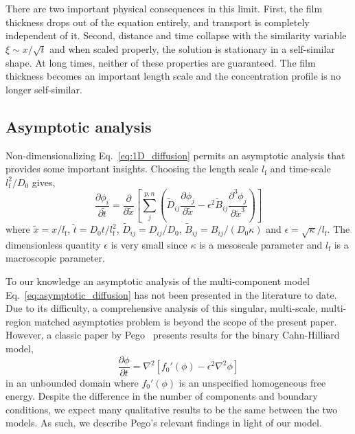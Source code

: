 \documentclass[journal=mamobx, layout=twocolumn]{achemso}
\newcommand{\txtf}{\mathrm{f}}
\begin{document}
There are two important physical consequences in this limit.
First, the film thickness drops out of the equation entirely, and transport is completely independent of it.
Second, distance and time collapse with the similarity variable $\xi \sim x/\sqrt{t}$ and when scaled properly, the solution is stationary in a self-similar shape.
At long times, neither of these properties are guaranteed.
The film thickness becomes an important length scale and the concentration profile is no longer self-similar.


\subsection{Asymptotic analysis}

Non-dimensionalizing Eq.~\ref{eq:1D_diffusion} permits an asymptotic analysis that provides some important insights.
Choosing the length scale $l_{\txtf}$ and time-scale $l_{\txtf}^{2}/D_{0}$ gives,
\begin{equation} \label{eq:asymptotic_diffusion}
\frac{\partial \phi_{i}}{\partial \tilde{t}} =  \frac{\partial}{\partial \tilde{x}} \left [ \sum_{j}^{p,n} \left ( \tilde{D}_{ij} \frac{\partial \phi_{j}}{\partial \tilde{x}} - \epsilon^{2} \tilde{B}_{ij} \frac{\partial^{3} \phi_{j}}{\partial \tilde{x}^{3}} \right ) \right ]
\end{equation}
where $\tilde{x} = x/l_{\txtf}$, $\tilde{t} = D_{0} t/l_{\txtf}^{2}$, $\tilde{D}_{ij} = D_{ij}/D_{0}$, $\tilde{B}_{ij} = B_{ij}/(D_{0} \kappa)$ and $\epsilon = \sqrt{\kappa}/l_{\txtf}$.
The dimensionless quantity $\epsilon$ is very small since $\kappa$ is a mesoscale parameter and $l_{\txtf}$ is a macroscopic parameter.

To our knowledge an asymptotic analysis of the multi-component model Eq.~\ref{eq:asymptotic_diffusion} has not been presented in the literature to date. 
Due to its difficulty, a comprehensive analysis of this singular, multi-scale, multi-region matched asymptotics problem is beyond the scope of the present paper.
However, a classic paper by Pego~\cite{Pego1989} presents results for the binary Cahn-Hilliard model,
\begin{equation} \label{eq:CH}
\frac{\partial \phi}{\partial t} = \nabla^{2} \left [ f_{0}'(\phi) - \epsilon^{2} \nabla^{2} \phi \right ]
\end{equation}
in an unbounded domain where $f_{0}'(\phi)$ is an unspecified homogeneous free energy.
Despite the difference in the number of components and boundary conditions, we expect many qualitative results to be the same between the two models.
As such, we describe Pego's relevant findings in light of our model.
\end{document}
